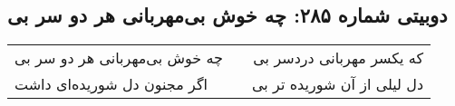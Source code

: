 \begin{center}
\section*{دوبیتی شماره ۲۸۵: چه خوش بی‌مهربانی هر دو سر بی}
\label{sec:285}
\begin{longtable}{l p{0.5cm} r}
چه خوش بی‌مهربانی هر دو سر بی
&&
که یکسر مهربانی دردسر بی
\\
اگر مجنون دل شوریده‌ای داشت
&&
دل لیلی از آن شوریده تر بی
\\
\end{longtable}
\end{center}

